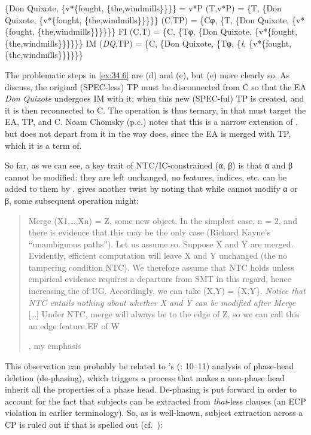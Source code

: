 \documentclass[output=paper]{langsci/langscibook}
\begin{document}
\ea%
    \label{ex:34.6}
	\ea \{Don Quixote, \{v*\{fought, \{the,windmills\}\}\}\} = v*P
	\ex {} (T,v*P) = \{T, \{Don Quixote, \{v*\{fought, \{the,windmills\}\}\}\}\}
	\ex {} (C,TP) = \{Cφ, \{T, \{Don Quixote, \{v*\{fought, \{the,windmills\}\}\}\}\}\}
	\ex \gls{FI} (C,T) = \{C, \{Tφ, \{Don Quixote, \{v*\{fought, \{the,windmills\}\}\}\}\}\}
    \ex \gls{IM} (\emph{DQ},TP) = \{C, \{Don Quixote, \{Tφ, \{\emph{t}, \{v*\{fought, \{the,windmills\}\}\}\}\}\}
	\z
\z

The problematic steps in \eqref{ex:34.6} are (d) and (e), but (e) more
clearly so. As \citet{EKS2012} discuss, the original (SPEC-less) TP must be
disconnected from C so that the \gls{EA} \emph{Don Quixote} undergoes \gls{IM}
with it; when this new (SPEC-ful) TP is created, and it is then reconnected to
C. The operation is thus ternary, in that  must target the \gls{EA}, TP,
and C.  Noam Chomsky (p.c.) notes that this is a narrow extension of , but
does not depart from it in the way  does, since the \gls{EA} is
merged with TP, which it is a term of.

So far, as we can see, a key trait of \gls{NTC}/\gls{IC}-constrained 
(α, β) is that α and β cannot be modified: they are left unchanged, no
features, indices, etc. can be added to them by .
\citet{Chomsky2007} gives another twist by noting that while  cannot
modify α or β, some subsequent operation might:

\blockquote[{\citealt[8]{Chomsky2007}, my emphasis}][.]{Merge
    (X1,\dots{},Xn) = Z, some new object. In the simplest case, n = 2, and
    there is evidence that this may be the only case (Richard Kayne’s
    “unambiguous paths”). Let us assume so. Suppose X and Y are merged.
    Evidently, efficient computation will leave X and Y unchanged (the
    no tampering condition \gls{NTC}). We therefore assume that \gls{NTC} holds
    unless empirical evidence requires a departure from \gls{SMT} in this
    regard, hence increasing the  of \gls{UG}. Accordingly, we can
    take  (X,Y) = \{X,Y\}. \emph{Notice that \gls{NTC} entails nothing
    about whether X and Y can be modified after Merge} [\dots{}] Under \gls{NTC},
    merge will always be to the edge of Z, so we can call this an edge feature
    \gls{EF} of W}

This observation can probably be related to \citeauthor{Chomsky2015}’s
(\citeyear{Chomsky2015}: 10--11) analysis of phase-head deletion (de-phasing),
which triggers a process that makes a non-phase head inherit all the properties
of a phase head.  De-phasing is put forward in order to account for the fact
that subjects can be extracted from \emph{that}{}-less clauses (an \gls{ECP}
violation in earlier terminology). So, as is well-known, subject extraction
across a CP is ruled out if that is spelled out
(cf.~\citealt{Chomsky1986,Rizzi1990}):
\end{document}

